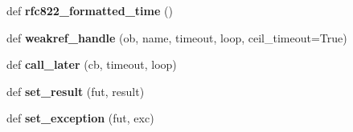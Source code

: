\begin{DoxyCompactItemize}
\mbox{\label{namespaceaiohttp_1_1helpers_a9bd153384a5966db80ce995dd6bb8278}} 
def {\bfseries rfc822\+\_\+formatted\+\_\+time} ()
\item 
\mbox{\label{namespaceaiohttp_1_1helpers_a882e303c7db80bd0d796714e27bb1d99}} 
def {\bfseries weakref\+\_\+handle} (ob, name, timeout, loop, ceil\+\_\+timeout=True)
\item 
\mbox{\label{namespaceaiohttp_1_1helpers_a9e114a8362c1ce6d37f40865d9e75ff2}} 
def {\bfseries call\+\_\+later} (cb, timeout, loop)
\item 
\mbox{\label{namespaceaiohttp_1_1helpers_a5ded3e9ee6dec3032552290f911f6cb7}} 
def {\bfseries set\+\_\+result} (fut, result)
\item 
\mbox{\label{namespaceaiohttp_1_1helpers_ab3619617131bba4a1ed40a08139987df}} 
def {\bfseries set\+\_\+exception} (fut, exc)
\end{DoxyCompactItemize}

